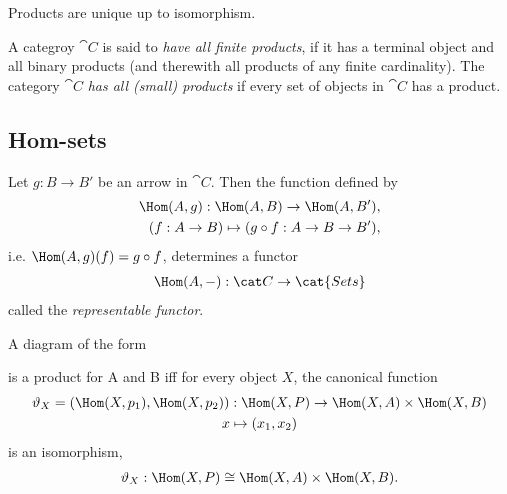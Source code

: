 \documentclass{article}
\begin{document}
\begin{theorem}[Awodey 2.17]
    Products are unique up to isomorphism.
\end{theorem}

\begin{definition}[Awodey 2.19]
    A categroy $\cat C$ is said to \emph{have all finite products}, if it has a
    terminal object and all binary products (and therewith all products of any
    finite cardinality). The category $\cat C$ \emph{has all (small) products}
    if every set of objects in $\cat C$ has a product.
\end{definition}

\subsection{Hom-sets}

\begin{theorem}
    Let $g:B\to B'$ be an arrow in $\cat C$. Then the function
    defined by
    \begin{align*}
        \Hom(A, g):\Hom(A,B)\to\Hom(A,B'),\\
        (f:A\to B) \mapsto (g\circ f:A\to B\to B'),
    \end{align*}
    i.e. $\Hom(A,g)(f)=g\circ f$, determines a functor
    \begin{align*}
        \Hom(A,-):\cat C \to \cat{Sets}
    \end{align*}
    called the \emph{representable functor}.
\end{theorem}

\begin{proposition}[Awodey 2.20]
    A diagram of the form
    \begin{center}
    \end{center}
    is a product for A and B iff for every object $X$, the canonical
    function
    \begin{gather*}
        \vartheta_X = (\Hom(X, p_1), \Hom(X, p_2)) : \Hom(X, P)\to \Hom(X,A)\times \Hom(X,B)\\
        x \mapsto (x_1, x_2)
    \end{gather*}
    is an isomorphism,
    \begin{align*}
        \vartheta_X:\Hom(X,P)\cong \Hom(X,A)\times\Hom(X,B).
    \end{align*}
\end{proposition}
\end{document}
